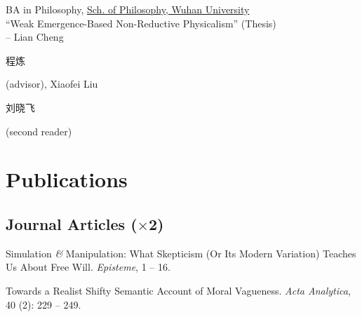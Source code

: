\documentclass[10pt]{article}
\begin{document}
\hangindent=0.8cm \quad BA in Philosophy, \href{https://philo.whu.edu.cn}{Sch. of Philosophy, Wuhan University}\hspace*{\fill}{\small Wuhan, Hubei, P. R. China}\\
``Weak Emergence-Based Non-Reductive Physicalism'' (Thesis)\\
-- Lian Cheng \begin{CJK}{UTF8}{fs}程炼\end{CJK} (advisor), Xiaofei Liu \begin{CJK}{UTF8}{fs}刘晓飞\end{CJK} (second reader)

\section*{Publications}




\subsection*{Journal Articles (\begin{math}\times\end{math}2)}

\hangindent=0.8cm Simulation \emph{\&} Manipulation: What Skepticism (Or Its Modern Variation) Teaches Us About Free Will. \emph{Episteme}, 1 -- 16.\medskip

\hangindent=0.8cm Towards a Realist Shifty Semantic Account of Moral Vagueness. \emph{Acta Analytica}, 40 (2): 229 -- 249.
\end{document}
